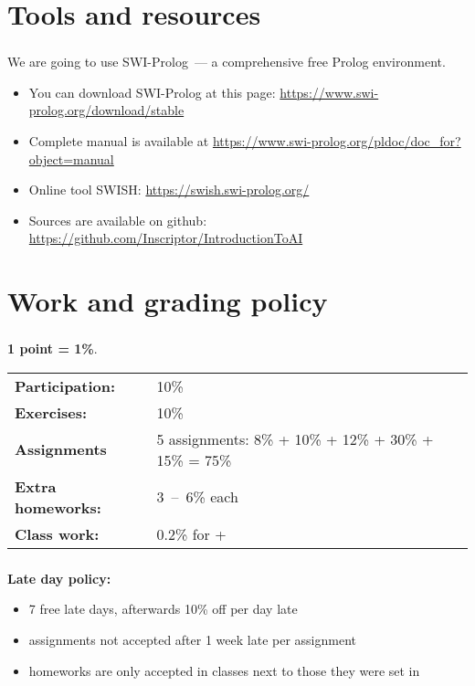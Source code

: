\section{Tools and resources}

\begin{frame}
	\frametitle{\insertsection}
	We are going to use SWI-Prolog~--- a comprehensive free Prolog environment.
	\begin{itemize}
		\item You can download SWI-Prolog at this page: \href{https://www.swi-prolog.org/download/stable}{https://www.swi-prolog.org/download/stable}
		\item Complete manual is available at \href{https://www.swi-prolog.org/pldoc/doc\_for?object=manual}{https://www.swi-prolog.org/pldoc/doc\_for?object=manual}
		\item Online tool SWISH: \href{https://swish.swi-prolog.org/}{https://swish.swi-prolog.org/}
		\item Sources are available on github: \href{https://github.com/Inscriptor/IntroductionToAI}{https://github.com/Inscriptor/IntroductionToAI}
	\end{itemize}
\end{frame}


\section{Work and grading policy}

\begin{frame}
	\frametitle{\insertsection}
	
	\textbf{1 point = 1\%}.
	
	\bgroup
	\def\arraystretch{1.5}
		\begin{tabular}{ll}
			\textbf{Participation:} & 10\% \\
			\textbf{Exercises:} & 10\% \\
			\textbf{Assignments} & 5 assignments: 8\% + 10\% + 12\% + 30\% + 15\% = 75\% \\
			\textbf{Extra homeworks:} & 3~--~6\% each \\
			\textbf{Class work:} & 0.2\% for + \\
		\end{tabular}
	\egroup
\end{frame}

\begin{frame}
	\frametitle{\insertsection}
	\textbf{Late day policy:}
	\begin{itemize}
		\item 7 free late days, afterwards 10\% off per day late
		\item assignments not accepted after 1 week late per assignment
		\item homeworks are only accepted in classes next to those they were set in
	\end{itemize}
\end{frame}


